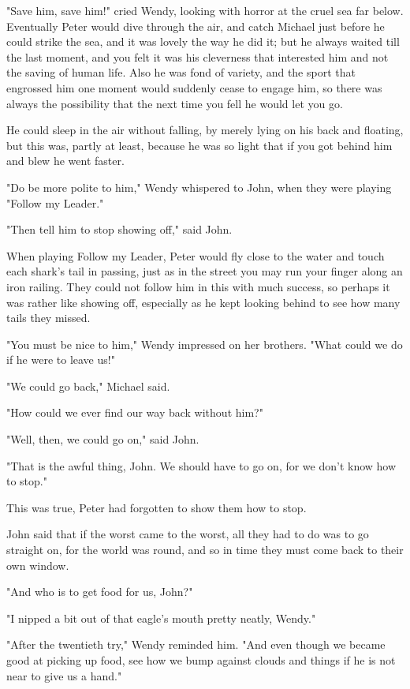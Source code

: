 "Save him, save him!" cried Wendy, looking with horror at the cruel sea
far below. Eventually Peter would dive through the air, and catch Michael
just before he could strike the sea, and it was lovely the way he did it;
but he always waited till the last moment, and you felt it was his
cleverness that interested him and not the saving of human life. Also he
was fond of variety, and the sport that engrossed him one moment would
suddenly cease to engage him, so there was always the possibility that the
next time you fell he would let you go.


He could sleep in the air without falling, by merely lying on his back and
floating, but this was, partly at least, because he was so light that if
you got behind him and blew he went faster.


"Do be more polite to him," Wendy whispered to John, when they were
playing "Follow my Leader."


"Then tell him to stop showing off," said John.


When playing Follow my Leader, Peter would fly close to the water and
touch each shark's tail in passing, just as in the street you may run your
finger along an iron railing. They could not follow him in this with much
success, so perhaps it was rather like showing off, especially as he kept
looking behind to see how many tails they missed.


"You must be nice to him," Wendy impressed on her brothers. "What could we
do if he were to leave us!"


"We could go back," Michael said.


"How could we ever find our way back without him?"


"Well, then, we could go on," said John.


"That is the awful thing, John. We should have to go on, for we don't know
how to stop."


This was true, Peter had forgotten to show them how to stop.


John said that if the worst came to the worst, all they had to do was to
go straight on, for the world was round, and so in time they must come
back to their own window.


"And who is to get food for us, John?"


"I nipped a bit out of that eagle's mouth pretty neatly, Wendy."


"After the twentieth try," Wendy reminded him. "And even though we became
good at picking up food, see how we bump against clouds and things if he
is not near to give us a hand."


